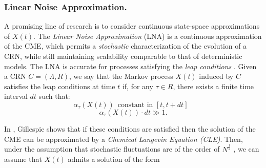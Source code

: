 \documentclass{llncs}
\begin{document}
\subsubsection{Linear Noise Approximation.}\label{lna-sec}
A promising line of research is to consider continuous state-space approximations of  $X(t)$. The \emph{Linear Noise Approximation} (LNA)%
\cite{Kampen1992b} is a continuous approximation of the CME, which permits a \emph{stochastic} characterization of the evolution of a CRN, while still maintaining scalability comparable to that of deterministic models.
The LNA is accurate for processes satisfying
the \emph{leap conditions} \cite{Wallace2012}. Given a CRN $C=(\Lambda,R)$, we say that the Markov process $X(t)$ induced by $C$ satisfies the leap conditions at time $t$ if, for any $\tau \in R$, there exists a finite time interval $dt$ such that:
\begin{equation} \label{leap1}
\alpha_{\tau}(X(t)) \,\,\,\text{constant in $[t,t+dt]$ }
\end{equation}
\begin{equation} \label{leap2}
\alpha_{\tau}(X(t))\cdot dt \gg 1. 
\end{equation}

In \cite{Gillespie2000},  Gillespie shows that if these conditions are satisfied then the solution of the CME can be approximated by a \emph{Chemical Langevin Equation (CLE)}.
Then, under the assumption that stochastic fluctuations are of the order of $N^{\frac{1}{2}}$ \cite{Kampen1992b,ethier2009markov}, we can assume that $X(t)$ admits a solution of the form
\end{document}
